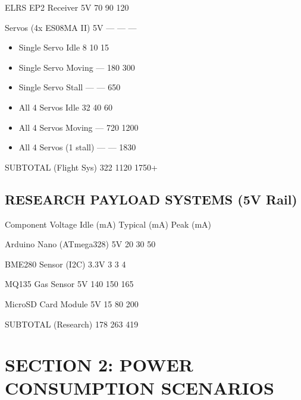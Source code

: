 \documentclass[11pt,letterpaper]{article}
\begin{document}
ELRS EP2 Receiver         5V           70           90           120\par

Servos (4x ES08MA II)     5V          ---          ---           ---\par

\begin{itemize}
  \item Single Servo Idle                   8           10            15
  \item Single Servo Moving                ---          180           300
  \item Single Servo Stall                 ---          ---           650
  \item All 4 Servos Idle                  32           40            60
  \item All 4 Servos Moving                ---          720          1200
  \item All 4 Servos (1 stall)             ---          ---          1830
\end{itemize}

SUBTOTAL (Flight Sys)                 322         1120          1750+\par

\subsection*{RESEARCH PAYLOAD SYSTEMS (5V Rail)}

Component               Voltage    Idle (mA)   Typical (mA)   Peak (mA)\par

Arduino Nano (ATmega328)  5V           20           30            50\par

BME280 Sensor (I2C)       3.3V          3            3             4\par

MQ135 Gas Sensor          5V          140          150           165\par

MicroSD Card Module       5V           15           80           200\par

SUBTOTAL (Research)                   178          263           419\par

\section{SECTION 2: POWER CONSUMPTION SCENARIOS}
\end{document}
